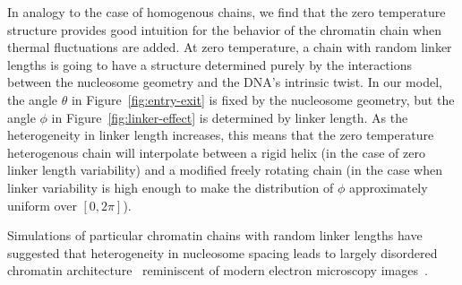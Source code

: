 \documentclass[%
 reprint,
superscriptaddress,
showpacs,preprintnumbers,
 amsmath,amssymb,
 aps,
 prl,
]{revtex4-1}
\begin{document}
In analogy to the case of homogenous chains, we find that the zero temperature
    structure provides good intuition for the behavior of the chromatin chain
    when thermal fluctuations are added.
At zero temperature, a chain with random linker lengths is going to have a
    structure determined purely by the interactions between the nucleosome geometry
    and the DNA's intrinsic twist.
In our model, the angle $\theta$ in Figure~\ref{fig:entry-exit} is fixed by the
    nucleosome geometry, but the angle $\phi$ in Figure~\ref{fig:linker-effect}
    is determined by linker length.
As the heterogeneity in linker length increases, this means that the
    zero temperature heterogenous chain will interpolate between a rigid helix
    (in the case of zero linker length variability) and a modified freely
    rotating chain (in the case when linker variability is high enough to make
    the distribution of $\phi$ approximately uniform over $[0, 2\pi]$).

Simulations of particular chromatin chains with random linker lengths have
    suggested that heterogeneity in nucleosome spacing leads to largely
    disordered chromatin architecture~\cite{woodcock1993,
    collepardo-guevara2014, bascom2017a} reminiscent of modern electron
    microscopy images~\cite{ou2017}.
\end{document}
